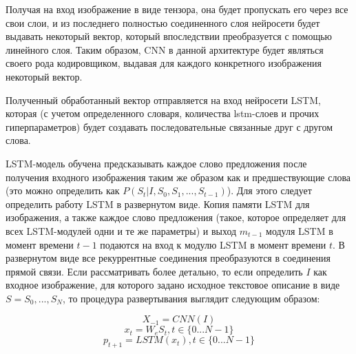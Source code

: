 \documentclass[bachelor, och, coursework]{SCWorks}
\begin{document}
        Получая на вход изображение в виде тензора, она будет пропускать его
        через все свои слои, и из последнего полностью соединенного слоя
        нейросети будет выдавать некоторый вектор, который впоследствии
        преобразуется с помощью линейного слоя. Таким образом, CNN в данной
        архитектуре будет являться своего рода кодировщиком, выдавая для каждого
        конкретного изображения некоторый вектор.
        
        Полученный обработанный вектор отправляется на вход нейросети LSTM,
        которая (с учетом определенного словаря, количества lstm-слоев и прочих
        гиперпараметров) будет создавать последовательные связанные друг с
        другом слова. 
        
        LSTM-модель обучена предсказывать каждое слово предложения после
        получения входного изображения таким же образом как и предшествующие
        слова (это можно определить как $P(S_t | I, S_0, S_1, ..., S_{t - 1})$).
        Для этого следует определить работу LSTM в развернутом виде. Копия
        памяти LSTM для изображения, а также каждое слово предложения (такое,
        которое определяет для всех LSTM-модулей одни и те же параметры) и выход
        $m_{t - 1}$ модуля LSTM в момент времени $t - 1$ подаются на вход к
        модулю LSTM в момент времени $t$. В развернутом виде все рекуррентные
        соединения преобразуются в соединения прямой связи. Если рассматривать
        более детально, то если определить $I$ как входное изображение, для
        которого задано исходное текстовое описание в виде $S = S_0, ..., S_N$,
        то процедура развертывания выглядит следующим образом:
        

        \[X_{-1} = CNN(I) \]
        \[x_t = W_e S_t, t \in \{0...N - 1 \} \]
        \[p_{t + 1} = LSTM(x_t), t \in \{0...N - 1 \} \]
\end{document}
